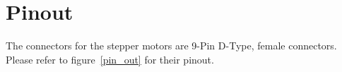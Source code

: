 


\clearpage

\section{Pinout}
The connectors for the stepper motors are 9-Pin D-Type, female connectors. Please refer to figure~\ref{pin_out} for their pinout.

